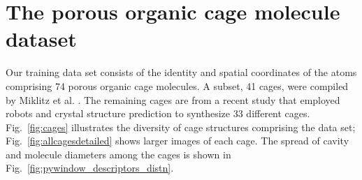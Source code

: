 \documentclass[journal=jacsat,manuscript=article,layout=traditional]{achemso}
\begin{document}

\section{The porous organic cage molecule dataset} Our training data set consists of the identity and spatial coordinates of the atoms comprising 74 porous organic cage molecules. A subset, 41 cages, were compiled by Miklitz et al. \cite{miklitz2017computational}. The remaining cages are from a recent study that employed robots and crystal structure prediction \cite{greenaway2018high} to synthesize 33 different cages. Fig.~\ref{fig:cages} illustrates the diversity of cage structures comprising the data set; Fig.~\ref{fig:allcagesdetailed} shows larger images of each cage. The spread of cavity and molecule diameters among the cages is shown in Fig.~\ref{fig:pywindow_descriptors_distn}.
\end{document}
